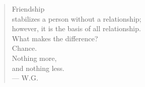 \begin{quote}
Friendship \\
stabilizes a person without a relationship; \\
however, it is the basis of all relationship. \\
What makes the difference? \\
Chance. \\
Nothing more, \\
and nothing less. \\
--- W.G.
\end{quote}

